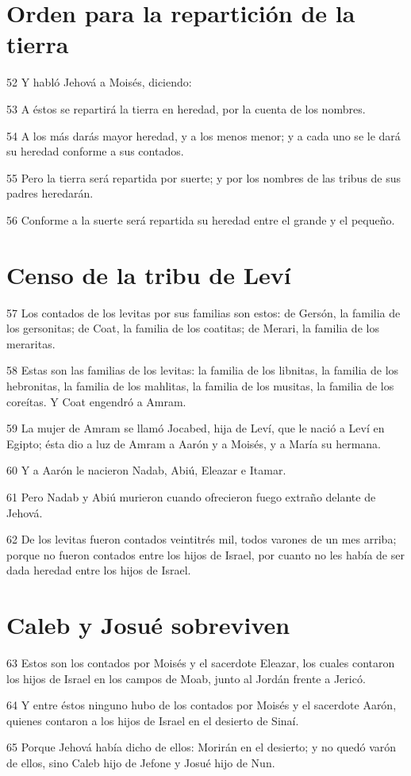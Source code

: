 \section*{Orden para la repartición de la tierra }

\par 52 Y habló Jehová a Moisés, diciendo:
\par 53 A éstos se repartirá la tierra en heredad, por la cuenta de los nombres.
\par 54 A los más darás mayor heredad, y a los menos menor; y a cada uno se le dará su heredad conforme a sus contados.
\par 55 Pero la tierra será repartida por suerte; y por los nombres de las tribus de sus padres heredarán.
\par 56 Conforme a la suerte será repartida su heredad entre el grande y el pequeño.

\section*{Censo de la tribu de Leví}

\par 57 Los contados de los levitas por sus familias son estos: de Gersón, la familia de los gersonitas; de Coat, la familia de los coatitas; de Merari, la familia de los meraritas.
\par 58 Estas son las familias de los levitas: la familia de los libnitas, la familia de los hebronitas, la familia de los mahlitas, la familia de los musitas, la familia de los coreítas. Y Coat engendró a Amram.
\par 59 La mujer de Amram se llamó Jocabed, hija de Leví, que le nació a Leví en Egipto; ésta dio a luz de Amram a Aarón y a Moisés, y a María su hermana.
\par 60 Y a Aarón le nacieron Nadab, Abiú, Eleazar e Itamar. 
\par 61 Pero Nadab y Abiú murieron cuando ofrecieron fuego extraño delante de Jehová.
\par 62 De los levitas fueron contados veintitrés mil, todos varones de un mes arriba; porque no fueron contados entre los hijos de Israel, por cuanto no les había de ser dada heredad entre los hijos de Israel.

\section*{Caleb y Josué sobreviven}

\par 63 Estos son los contados por Moisés y el sacerdote Eleazar, los cuales contaron los hijos de Israel en los campos de Moab, junto al Jordán frente a Jericó.
\par 64 Y entre éstos ninguno hubo de los contados por Moisés y el sacerdote Aarón, quienes contaron a los hijos de Israel en el desierto de Sinaí.
\par 65 Porque Jehová había dicho de ellos: Morirán en el desierto; y no quedó varón de ellos, sino Caleb hijo de Jefone y Josué hijo de Nun. 

